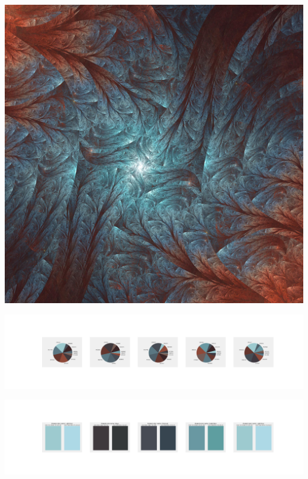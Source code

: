 \documentclass[11pt]{article}
\begin{document}
\begin{landscape}
    \begin{center}
    \includegraphics[width=\textwidth]{./nbimg/file (405).jpg}
    \end{center}

    \begin{center}
    \includegraphics[width=250mm]{./nbimg/pie-340.jpg}
    \end{center}

    \begin{center}
    \includegraphics[width=250mm]{./nbimg/peak-340.jpg}
    \end{center}
    


\end{landscape}
\end{document}
